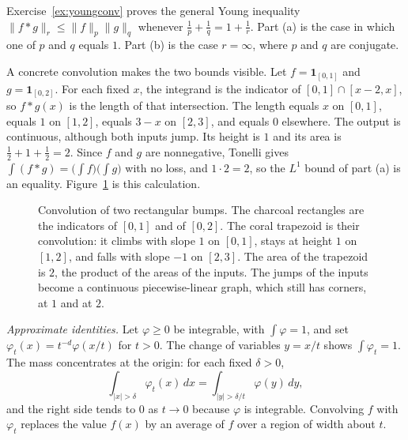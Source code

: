 Exercise~\ref{ex:youngconv} proves the general Young inequality $\|f*g\|_r\le\|f\|_p\|g\|_q$ whenever $\frac1p+\frac1q=1+\frac1r$. Part (a) is the case in which one of $p$ and $q$ equals $1$. Part (b) is the case $r=\infty$, where $p$ and $q$ are conjugate.

A concrete convolution makes the two bounds visible. Let $f=\mathbf 1_{[0,1]}$ and $g=\mathbf 1_{[0,2]}$. For each fixed $x$, the integrand is the indicator of $[0,1]\cap[x-2,x]$, so $f*g(x)$ is the length of that intersection. The length equals $x$ on $[0,1]$, equals $1$ on $[1,2]$, equals $3-x$ on $[2,3]$, and equals $0$ elsewhere. The output is continuous, although both inputs jump. Its height is $1$ and its area is $\frac12+1+\frac12=2$. Since $f$ and $g$ are nonnegative, Tonelli gives $\int(f*g)=\bigl(\int f\bigr)\bigl(\int g\bigr)$ with no loss, and $1\cdot2=2$, so the $L^1$ bound of part (a) is an equality. Figure~\ref{fig:rwconv} is this calculation.

\begin{figure}[ht]
\centering
{}
\caption{Convolution of two rectangular bumps. The charcoal rectangles are the indicators of $[0,1]$ and of $[0,2]$. The coral trapezoid is their convolution: it climbs with slope $1$ on $[0,1]$, stays at height $1$ on $[1,2]$, and falls with slope $-1$ on $[2,3]$. The area of the trapezoid is $2$, the product of the areas of the inputs. The jumps of the inputs become a continuous piecewise-linear graph, which still has corners, at $1$ and at $2$.}
\label{fig:rwconv}
\end{figure}

\emph{Approximate identities.} Let $\varphi\ge0$ be integrable, with $\int\varphi=1$, and set $\varphi_t(x)=t^{-d}\varphi(x/t)$ for $t>0$. The change of variables $y=x/t$ shows $\int\varphi_t=1$. The mass concentrates at the origin: for each fixed $\delta>0$,
\[\int_{|x|>\delta}\varphi_t(x)\,dx=\int_{|y|>\delta/t}\varphi(y)\,dy,\]
and the right side tends to $0$ as $t\to0$ because $\varphi$ is integrable. Convolving $f$ with $\varphi_t$ replaces the value $f(x)$ by an average of $f$ over a region of width about $t$.

